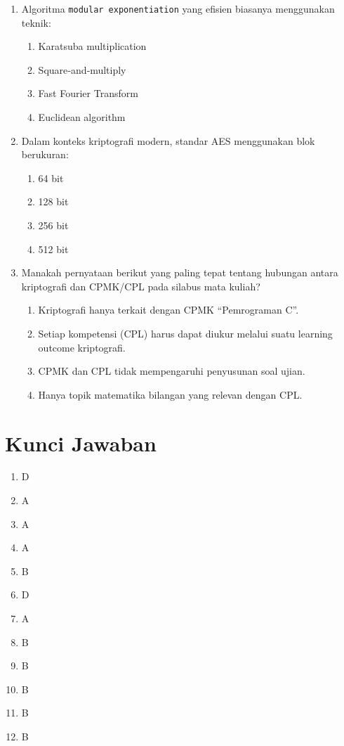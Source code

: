 \documentclass[12pt]{article}
\begin{document}
\begin{enumerate}[label=\textbf{Soal \arabic*.}, leftmargin=*, itemsep=1.5em]
    \item Algoritma \texttt{modular exponentiation} yang efisien biasanya menggunakan teknik:
    \begin{enumerate}[label=\Alph*.]
        \item Karatsuba multiplication
        \item Square‑and‑multiply
        \item Fast Fourier Transform
        \item Euclidean algorithm
    \end{enumerate}

    \item Dalam konteks kriptografi modern, standar AES menggunakan blok berukuran:
    \begin{enumerate}[label=\Alph*.]
        \item 64 bit
        \item 128 bit
        \item 256 bit
        \item 512 bit
    \end{enumerate}

    \item Manakah pernyataan berikut yang paling tepat tentang hubungan antara kriptografi dan CPMK/CPL pada silabus mata kuliah?
    \begin{enumerate}[label=\Alph*.]
        \item Kriptografi hanya terkait dengan CPMK “Pemrograman C”.
        \item Setiap kompetensi (CPL) harus dapat diukur melalui suatu learning outcome kriptografi.
        \item CPMK dan CPL tidak mempengaruhi penyusunan soal ujian.
        \item Hanya topik matematika bilangan yang relevan dengan CPL.
    \end{enumerate}
\end{enumerate}

\newpage
\section*{Kunci Jawaban}
\begin{enumerate}[label=\textbf{Soal \arabic*.}]
    \item D
    \item A
    \item A
    \item A
    \item B
    \item D
    \item A
    \item B
    \item B
    \item B
    \item B
    \item B
\end{enumerate}
\end{document}

